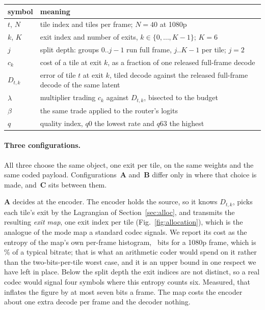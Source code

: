 \documentclass[10pt,twocolumn,letterpaper]{article}
\begin{document}
\begin{center}\small
\begin{tabular}{@{}l p{}@{}}
\toprule
symbol & meaning \\
\midrule
$t$, $N$ & tile index and tiles per frame; $N{=}40$ at 1080p \\
$k$, $K$ & exit index and number of exits, $k\in\{0,\dots,K-1\}$; $K{=}6$ \\
$j$ & split depth: groups $0..j{-}1$ run full frame, $j..K{-}1$ per tile; $j{=}2$ \\
$c_k$ & cost of a tile at exit $k$, as a fraction of one released full-frame decode \\
$D_{t,k}$ & error of tile $t$ at exit $k$, tiled decode against the released full-frame decode of the same latent \\
$\lambda$ & multiplier trading $c_k$ against $D_{t,k}$, bisected to the budget \\
$\beta$ & the same trade applied to the router's logits \\
$q$ & quality index, $q0$ the lowest rate and $q63$ the highest \\
\bottomrule
\end{tabular}
\end{center}

\paragraph{Three configurations.} All three choose the same object, one exit per
tile, on the same weights and the same coded payload. Configurations~\textbf{A}
and~\textbf{B} differ only in where that choice is made, and~\textbf{C} sits
between them.

\textbf{A} decides at the encoder. The encoder holds the source, so it knows
$D_{t,k}$, picks each tile's exit by the Lagrangian of Section~\ref{sec:alloc},
and transmits the resulting \emph{exit map}, one exit index per tile (Fig.~\ref{fig:allocation}), which is
the analogue of the mode map a standard codec signals. We report its cost as the
entropy of the map's own per-frame histogram, \MapBits\ bits for a 1080p frame,
which is \MapOverheadLow\% of a typical bitrate; that is what an arithmetic coder
would spend on it rather than the two-bits-per-tile worst case, and it is an
upper bound in one respect we have left in place. Below the split depth the exit
indices are not distinct, so a real codec would signal four symbols where this
entropy counts six. Measured, that inflates the figure by at most seven bits a
frame. The map costs the encoder about one extra decode per frame and the decoder
nothing.
\end{document}
